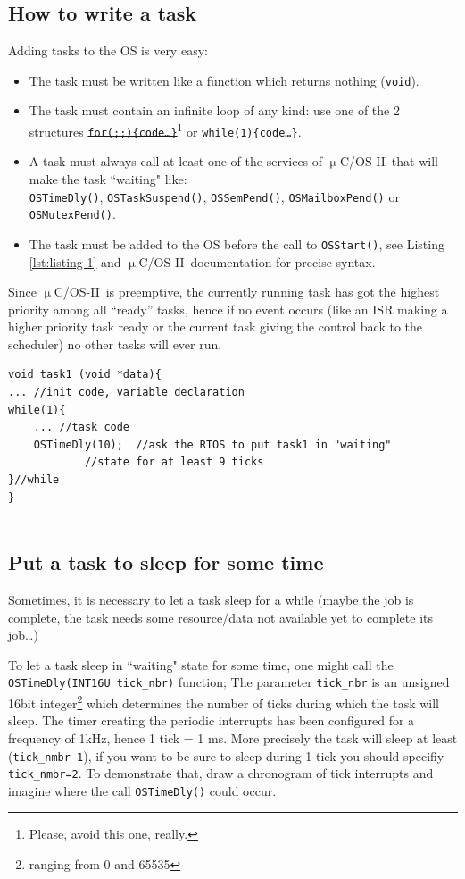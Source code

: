 \documentclass[10pt,a4paper]{article}
\renewcommand{\marginpar}[1]{} %
\theoremstyle{definition}%
\newcommand{\uCOSII}{$\upmu$C/OS-II}
\newcommand{\kw}[1]{\texttt{#1}}
\begin{document}
\subsection{How to write a task}
Adding tasks to the OS is very easy:
\begin{itemize}
\item The task must be written like a function which returns nothing (\kw{void}).
\item The task must contain an infinite loop of any kind: use one of the 2 structures \sout{\kw{for(;;)\{code\dots\}}}\footnote{Please, avoid this one, really.} or \kw{while(1)\{code\dots\}}.
\item A task must always call at least one of the services of \uCOSII~that will make the task \mbox{``waiting"}
like:\\ \kw{OSTimeDly()}, \kw{OSTaskSuspend()}, \kw{OSSemPend()}, \kw{OSMailboxPend()} or \kw{OSMutexPend()}. 
\item The task must be added to the OS before the call to \kw{OSStart()}, see Listing \ref{lst:listing 1} and \uCOSII~documentation for precise syntax.
\end{itemize}
Since \uCOSII~is preemptive, the currently running task has got the highest priority among all “ready”
tasks, hence if no event occurs (like an ISR making a higher priority task ready or the current task
giving the control back to the scheduler) no other tasks will ever run.

\begin{lstlisting}[caption={task1.c Basic task example}, label={lst:listing 2}]
void task1 (void *data){
... //init code, variable declaration
while(1){
	... //task code
	OSTimeDly(10);	//ask the RTOS to put task1 in "waiting"
			//state for at least 9 ticks
}//while
}


\end{lstlisting}

\subsection{Put a task to sleep for some time}
Sometimes, it is necessary to let a task sleep for a while (maybe the job is complete, the task needs some resource/data not available yet to complete its job\dots)%

To let a task sleep in ``waiting" state for some time, one might call the \kw{OSTimeDly(INT16U tick\_nbr)} function;
The parameter \kw{tick\_nbr} is an unsigned 16bit integer\footnote{ranging from 0 and 65535} which
determines the number of ticks during which the task will sleep. The timer creating the periodic
interrupts has been configured for a frequency of 1kHz, hence 1 tick = 1 ms.
More precisely the task will sleep at least (\kw{tick\_nmbr-1}), if you want to be sure to sleep during 1 tick
you should specifiy \kw{tick\_nmbr=2}.
To demonstrate that, draw a chronogram of tick interrupts and imagine where the call \kw{OSTimeDly()}
could occur.
\end{document}
